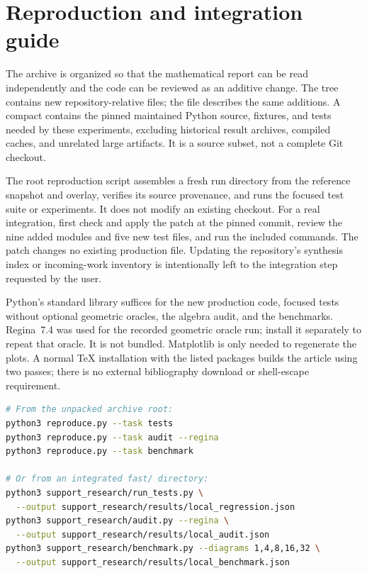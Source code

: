 \appendix
\section{Reproduction and integration guide}
\label{sec:reproduce}

The archive is organized so that the mathematical report can be read
independently and the code can be reviewed as an additive change.  The
 tree contains new repository-relative files; the
 file describes the same additions.  A compact
 contains the pinned maintained Python source,
fixtures, and tests needed by these experiments, excluding historical result
archives, compiled caches, and unrelated large artifacts.  It is a source
subset, not a complete Git checkout.

The root reproduction script assembles a fresh run directory from the
reference snapshot and overlay, verifies its source provenance, and runs the
focused test suite or experiments.  It does not modify an existing checkout.
For a real integration, first check and apply the patch at the pinned commit,
review the nine added modules and five new test files, and run the included
commands.  The patch changes no existing production file.  Updating the
repository's synthesis index or incoming-work inventory is intentionally left
to the integration step requested by the user.

Python's standard library suffices for the new production code, focused tests
without optional geometric oracles, the algebra audit, and the benchmarks.
Regina~7.4 was used for the recorded geometric oracle run; install it separately
to repeat that oracle.  It is not bundled.  Matplotlib is only needed to
regenerate the plots.  A normal TeX installation with the listed packages
builds the article using two  passes; there is no external
bibliography download or shell-escape requirement.

\begin{lstlisting}[language=bash]
# From the unpacked archive root:
python3 reproduce.py --task tests
python3 reproduce.py --task audit --regina
python3 reproduce.py --task benchmark

# Or from an integrated fast/ directory:
python3 support_research/run_tests.py \
  --output support_research/results/local_regression.json
python3 support_research/audit.py --regina \
  --output support_research/results/local_audit.json
python3 support_research/benchmark.py --diagrams 1,4,8,16,32 \
  --output support_research/results/local_benchmark.json
\end{lstlisting}

